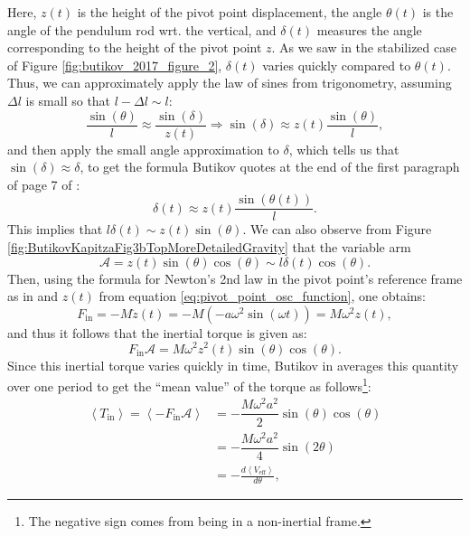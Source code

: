 \documentclass[12pt, letterpaper]{article}
\begin{document}
Here, $z(t)$ is the height of the pivot point displacement, the angle $\theta(t)$ is the angle of the pendulum rod wrt. the vertical, and $\delta(t)$ measures the angle corresponding to the height of the pivot point $z$. As we saw in the stabilized case of Figure \ref{fig:butikov_2017_figure_2}, $\delta(t)$ varies quickly compared to $\theta(t)$. Thus, we can approximately apply the law of sines from trigonometry, assuming $\Delta l$ is small so that $l - \Delta l \sim l$:
\begin{equation}
  \dfrac{\sin(\theta)}{l} \approx \dfrac{\sin(\delta)}{z(t)} \Rightarrow \sin(\delta) \approx z(t) \dfrac{\sin(\theta)}{l} \label{eq:law_of_sines_to_delta},
\end{equation}
and then apply the small angle approximation to $\delta$, which tells us that $\sin(\delta) \approx \delta$, to get the formula Butikov quotes at the end of the first paragraph of page 7 of \cite{Butikov2017KapitzaS}:
\begin{equation}
  \delta(t) \approx z(t) \dfrac{\sin(\theta(t))}{l} \label{eq:time_averaged_approximation_of_delta}.
\end{equation}
This implies that $l\delta(t) \sim z(t)\sin(\theta)$. We can also observe from Figure \ref{fig:ButikovKapitzaFig3bTopMoreDetailedGravity} that the variable arm 
\begin{equation}
  \mathcal{A} = z(t)\sin(\theta)\cos(\theta) \sim l\delta(t)\cos(\theta) \label{eq:variable_arm}.
\end{equation}
Then, using the formula for Newton's 2nd law in the pivot point's reference frame as in \cite{Butikov2017KapitzaS} and $z(t)$ from equation \ref{eq:pivot_point_osc_function}, one obtains:
\begin{equation}
    F_{\text{in}} = -M\ddot{z}(t) = -M\left(-a\omega^2\sin(\omega t)\right) = M\omega^2 z(t)\label{eq:pseudo_inertia_force},
\end{equation}
and thus it follows that the inertial torque is given as:
\begin{equation}
    F_{\text{in}} \mathcal{A} = M\omega^2 z^2(t) \sin(\theta)\cos(\theta) \label{eq:intertial_torque_from_vert_osc}.
\end{equation}
Since this inertial torque varies quickly in time, Butikov in \cite{Butikov2017KapitzaS} averages this quantity over one period to get the ``mean value'' of the torque as follows\footnote{The negative sign comes from being in a non-inertial frame.}:
\begin{align}
    \left<T_{\text{in}}\right> = \left<-F_{\text{in}}\mathcal{A}\right> &= - \dfrac{M\omega^2 a^2}{2}\sin(\theta)\cos(\theta)  \nonumber \\
    &= -\dfrac{M\omega^2 a^2}{4}\sin(2\theta) \nonumber \\
    &= -\frac{d\left<V_{\mathrm{eff}}\right>}{d\theta} \label{eq:averaged_inertial_torque},
\end{align}
\end{document}
